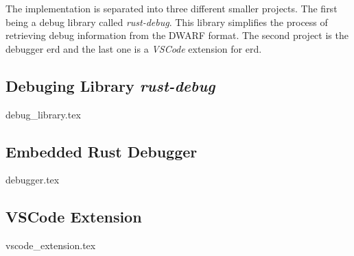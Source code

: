 

The implementation is separated into three different smaller projects.
The first being a debug library called \emph{rust-debug}.
This library simplifies the process of retrieving debug information from the \gls{DWARF} format.
The second project is the debugger \gls{erd} and the last one is a \emph{VSCode} extension for \gls{erd}.


\subsection{Debuging Library \emph{rust-debug}}
\label{subsection:rust-debug}
{debug_library.tex}


\subsection{Embedded Rust Debugger}
{debugger.tex}


\subsection{VSCode Extension}
{vscode_extension.tex}

